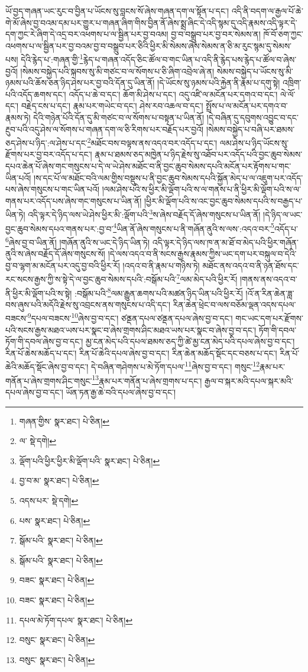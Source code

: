 ཡོ་བྱད་གཞན་ཡང་རུང་བ་བྱིན་པ་ཡོངས་སུ་བླངས་སོ་ཞེས་གཞན་དག་ལ་སྟོན་པ་དང་། འདི་ནི་བདག་ལ་རྒྱལ་པོ་ཆེ་གེ་མོ་ཞེས་བྱ་བའམ་དམ་པར་གྱུར་པ་གཞན་ཞིག་གིས་བྱིན་ནོ་ཞེས་སྨྲ་ཞིང་དེ་འདི་སྙམ་དུ་འདི་རྣམས་འདི་ལྟར་དེ་དག་ཀྱང་རེ་ཞིག་དེ་འདྲ་བར་འཕགས་པ་ལ་སྦྱིན་པར་བྱ་བའམ། བྱ་བ་བསྒྲུབ་པར་བྱ་བར་སེམས་ན། ཁོ་བོ་ཅག་ཀྱང་འཕགས་པ་ལ་སྦྱིན་པར་བྱ་བའམ་བྱ་བ་བསྒྲུབ་པར་ཅིའི་ཕྱིར་མི་སེམས་ཞེས་སེམས་ན་ཅི་མ་རུང་སྙམ་དུ་སེམས་པས། དེའི་རྙེད་པ་:གཞན་གྱི་\footnote{གཞན་གྱིས་  སྣར་ཐང་།  པེ་ཅིན། }རྙེད་པ་གཞན་འདོད་ཅིང་ཚོལ་བ་གང་ཡིན་པ་འདི་ནི་རྙེད་པས་རྙེད་པ་ཚོལ་བ་ཞེས་བྱའོ། །སེམས་བསྐྱེད་པའི་སྐབས་སུ་མི་གཙང་བ་ལ་སོགས་པ་ཅི་ཞིག་འབྲེལ་ཞེ་ན། སེམས་བསྐྱེད་པ་ཡོངས་སུ་མི་ཉམས་པའི་ཆོས་ཅན་ཉིད་ཤེས་པར་བྱ་བའི་དོན་དུ་ཡིན་ནོ། །དེ་ཡོངས་སུ་ཉམས་པའི་རྐྱེན་ནི་རྣམ་པ་དགུ་སྟེ། འཁྲིག་པའི་འདོད་ཆགས་དང་། འདོད་པ་ཆེ་བ་དང་། ཆོག་མི་ཤེས་པ་དང་། འདུ་འཛི་ལ་མངོན་པར་དགའ་བ་དང་། ལེ་ལོ་དང་། བརྗེད་ངས་པ་དང་། རྣམ་པར་གཡེང་བ་དང་། ཤེས་རབ་འཆལ་བ་དང་། སྤྲོས་པ་ལ་མངོན་པར་དགའ་བ་རྣམས་ཏེ། དེའི་གཉེན་པོའི་དོན་དུ་མི་གཙང་བ་ལ་སོགས་པ་བསྟན་པ་ཡིན་ནོ། །དེ་བཞིན་དུ་དབུགས་འབྱུང་བ་དང་རྔུབ་པའི་འདུ་ཤེས་ལ་སོགས་པ་གཞན་དག་ལ་ཅི་རིགས་པར་བརྗོད་པར་བྱའོ། །སེམས་བསྐྱེད་པ་བཞི་པར་ཐམས་ཅད་ཤེས་པ་ཉིད་:ལ་ཤེས་པ་དང་\footnote{ལ་  སྡེ་དགེ། }མཐོང་བས་བལྟས་ནས་འདའ་བར་འདོད་པ་དང་། ལམ་ཤེས་པ་ཉིད་ཡོངས་སུ་རྫོགས་པར་བྱ་བར་འདོད་པ་དང་། རྣམ་པ་ཐམས་ཅད་མཁྱེན་པ་ཉིད་རྗེས་སུ་འཐོབ་པར་འདོད་པའི་བྱང་ཆུབ་སེམས་དཔའ་ཆེན་པོ་ཞེས་གང་གསུངས་པ་དེ་ལ་ཡེ་ཤེས་མཐོང་བ་ནི་བྱང་ཆུབ་སེམས་དཔའི་མངོན་པར་རྟོགས་པ་གང་ཡིན་པའོ། །ས་དང་པོ་ལ་མཐོང་བའི་ལམ་གྱིས་བསྡུས་པ་ནི་བྱང་ཆུབ་སེམས་དཔའི་སྐྱོན་མེད་པ་ལ་འཇུག་པར་འདོད་པས་ཞེས་གསུངས་པ་གང་ཡིན་པའོ། །ལམ་ཤེས་པའི་ས་ཕྱིར་མི་ལྡོག་པའི་ས་ལ་གནས་པ་ནི་ཕྱིར་མི་ལྡོག་པའི་ས་ལ་གནས་པར་འདོད་པས་ཞེས་གང་གསུངས་པ་ཡིན་ནོ། །ཕྱིར་མི་ལྡོག་པའི་ས་འང་བྱང་ཆུབ་སེམས་དཔའི་ས་བརྒྱད་པ་ཡིན་ཏེ། འདི་ལྟར་དེ་ཉིད་ལས་ཡེ་ཤེས་ཕྱིར་མི་:ལྡོག་པའི་\footnote{ལྡོག་པའི་ཕྱིར་ཕྱིར་མི་ལྡོག་པའི་  སྣར་ཐང་།  པེ་ཅིན། }ས་ཞེས་བརྗོད་དོ་ཞེས་གསུངས་པ་ཡིན་ནོ། །དེ་ཉིད་ལ་ཡང་བྱང་ཆུབ་སེམས་དཔའ་གནས་པར་:བྱ་བ་\footnote{བྱ་བ་མ་  སྣར་ཐང་།  པེ་ཅིན། }ཡིན་ནོ་ཞེས་གསུངས་པ་ནི་གཞོན་ནུའི་ས་ལས་:འདའ་བར་\footnote{འདས་པར་  སྡེ་དགེ། }འདོད་པ་\footnote{པས་  སྣར་ཐང་།  པེ་ཅིན། }ཞེས་བྱ་བ་ཡིན་ནོ། །གཞོན་ནུའི་ས་ཡང་དེ་ཉིད་ཡིན་ཏེ། འདི་ལྟར་དེ་ཉིད་ལས་ཁ་ན་མ་ཐོ་བ་མེད་པའི་ཕྱིར་གཞོན་ནུའི་ས་ཞེས་བརྗོད་དོ་ཞེས་གསུངས་སོ། །དེ་ལས་འདའ་བ་ནི་སངས་རྒྱས་རྣམས་ཀྱིས་ཡང་དག་པར་བསྐུལ་བ་དེའི་བྱ་བ་ལྷག་མ་མངོན་པར་འདུ་བྱ་བའི་ཕྱིར་རོ། །འདའ་བ་ནི་རྣམ་པ་གཉིས་ཏེ། མཐོང་ནས་འདའ་བ་ནི་ཉན་ཐོས་དང་རང་སངས་རྒྱས་ཀྱི་ས་སྟེ་དེ་ལ་བྱང་ཆུབ་སེམས་དཔའི་:བསྒོམ་པའི་\footnote{སྒོམ་པའི་  སྣར་ཐང་།  པེ་ཅིན། }ལམ་མེད་པའི་ཕྱིར་རོ། །གནས་ནས་འདའ་བ་ནི་ཕྱིར་མི་ལྡོག་པའི་ས་སྟེ། :བསྒོམ་པའི་\footnote{སྒོམ་པའི་  སྣར་ཐང་།  པེ་ཅིན། }ལམ་རྒྱུན་ཆགས་པའི་མཚན་ཉིད་ཡིན་པའི་ཕྱིར་རོ། །འོ་ན་རིན་ཆེན་ཟླ་བས་ཞུས་པའི་མདོའི་རྗེས་སུ་འབྲངས་ནས་གསུངས་པ་འདི་དང་། རིན་ཆེན་ཕྲེང་བ་ལས་བཅོམ་ལྡན་འདས་དཔལ་བཟངས་\footnote{བཟང་  སྣར་ཐང་།  པེ་ཅིན། }དཔལ་བཟངས་\footnote{བཟང་  སྣར་ཐང་།  པེ་ཅིན། }ཞེས་བྱ་བ་དང་། ཙནྡན་དཔལ་ཙནྡན་དཔལ་ཞེས་བྱ་བ་དང་། གང་ཡང་དག་པར་རྫོགས་པའི་སངས་རྒྱས་མཐའ་ཡས་པར་སྣང་བ་ཞེས་གྲགས་ཤིང་མཐའ་ཡས་པར་སྣང་བ་ཞེས་བྱ་བ་དང་། ཏོག་གི་དབལ་ཏོག་གི་དབལ་ཞེས་བྱ་བ་དང་། མྱ་ངན་མེད་པའི་དཔལ་ཐམས་ཅད་ཀྱི་ཚེ་མྱ་ངན་མེད་པའི་དཔལ་ཞེས་བྱ་བ་དང་། རིན་པོ་ཆེས་མཆོད་པ་དང་། རིན་པོ་ཆེའི་དཔལ་ཞེས་བྱ་བ་དང་། རིན་ཆེན་མཆོད་སྡོང་དང་བཅས་པ་དང་། རིན་པོ་ཆེའི་མཆོད་སྡོང་ཞེས་བྱ་བ་དང་། དེ་བཞིན་གཤེགས་པ་མེ་ཏོག་དཔལ་\footnote{དཔལ་མེ་ཏོག་དཔལ་  སྣར་ཐང་།  པེ་ཅིན། }ཞེས་བྱ་བ་དང་། གསུང་\footnote{བསུང་  སྣར་ཐང་།  པེ་ཅིན། }རྣམ་པར་གནོན་པ་ཞེས་གྲགས་ཤིང་གསུང་\footnote{བསུང་  སྣར་ཐང་།  པེ་ཅིན། }རྣམ་པར་གནོན་པ་ཞེས་གྲགས་པ་དང་། རྒྱལ་བ་སྐར་མའི་དཔལ་སྐར་མའི་དཔལ་ཞེས་བྱ་བ་དང་། ཡོན་ཏན་རྒྱ་ཆེ་བའི་དཔལ་ཞེས་བྱ་བ་དང་། 